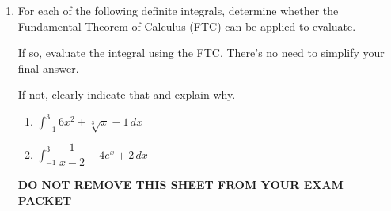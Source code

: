 \documentclass[11pt]{article}
\begin{document}
\begin{enumerate}

\newpage


\item For each of the following definite integrals, determine whether the Fundamental Theorem of Calculus (FTC) can be applied to evaluate. 

If so, evaluate the integral using the FTC. There's no need to simplify your final answer.

If not, clearly indicate that and explain why.

\begin{enumerate}
    \item $\displaystyle\int_{-1}^{3}6x^2+\sqrt[3]{x}-1\, dx$

    \vfill

    \item $\displaystyle\int_{-1}^3\dfrac{1}{x-2}-4e^x+2\, dx$

    \vfill
\end{enumerate}


\newpage

\begin{center}
{\bf DO NOT REMOVE THIS SHEET FROM YOUR EXAM PACKET}
\end{center}


\end{enumerate}
\end{document}
